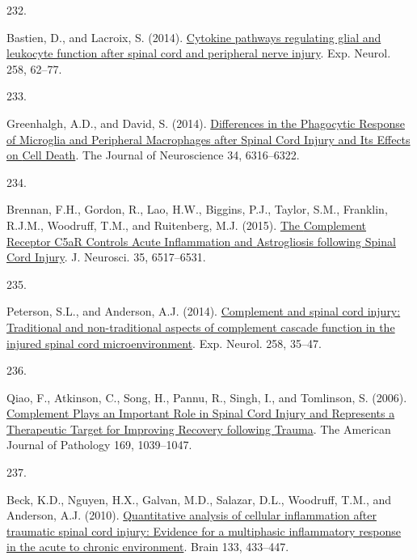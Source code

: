 \documentclass[
]{article}
\newlength{\cslhangindent}
\newlength{\csllabelwidth}
\newlength{\cslentryspacingunit} %
\newenvironment{CSLReferences}[2] %
 {%
  \setlength{\parindent}{0pt}
  \ifodd #1
  \let\oldpar\par
  \def\par{\hangindent=\cslhangindent\oldpar}
  \fi
  \setlength{\parskip}{#2\cslentryspacingunit}
 }%
 {}
\newcommand{\CSLLeftMargin}[1]{\parbox[t]{\csllabelwidth}{#1}}
\newcommand{\CSLRightInline}[1]{\parbox[t]{\linewidth - \csllabelwidth}{#1}\break}
\begin{document}
\begin{CSLReferences}{0}{0}
\leavevmode{}%
\CSLLeftMargin{232. }
\CSLRightInline{Bastien, D., and Lacroix, S. (2014). \href{https://doi.org/10.1016/j.expneurol.2014.04.006}{Cytokine pathways regulating glial and leukocyte function after spinal cord and peripheral nerve injury}. Exp. Neurol. 258, 62--77.}

\leavevmode{}%
\CSLLeftMargin{233. }
\CSLRightInline{Greenhalgh, A.D., and David, S. (2014). \href{https://doi.org/10.1523/JNEUROSCI.4912-13.2014}{Differences in the {Phagocytic Response} of {Microglia} and {Peripheral Macrophages} after {Spinal Cord Injury} and {Its Effects} on {Cell Death}}. The Journal of Neuroscience 34, 6316--6322.}

\leavevmode{}%
\CSLLeftMargin{234. }
\CSLRightInline{Brennan, F.H., Gordon, R., Lao, H.W., Biggins, P.J., Taylor, S.M., Franklin, R.J.M., Woodruff, T.M., and Ruitenberg, M.J. (2015). \href{https://doi.org/10.1523/JNEUROSCI.5218-14.2015}{The {Complement Receptor C5aR Controls Acute Inflammation} and {Astrogliosis} following {Spinal Cord Injury}}. J. Neurosci. 35, 6517--6531.}

\leavevmode{}%
\CSLLeftMargin{235. }
\CSLRightInline{Peterson, S.L., and Anderson, A.J. (2014). \href{https://doi.org/10.1016/j.expneurol.2014.04.028}{Complement and spinal cord injury: {Traditional} and non-traditional aspects of complement cascade function in the injured spinal cord microenvironment}. Exp. Neurol. 258, 35--47.}

\leavevmode{}%
\CSLLeftMargin{236. }
\CSLRightInline{Qiao, F., Atkinson, C., Song, H., Pannu, R., Singh, I., and Tomlinson, S. (2006). \href{https://doi.org/10.2353/ajpath.2006.060248}{Complement {Plays} an {Important Role} in {Spinal Cord Injury} and {Represents} a {Therapeutic Target} for {Improving Recovery} following {Trauma}}. The American Journal of Pathology 169, 1039--1047.}

\leavevmode{}%
\CSLLeftMargin{237. }
\CSLRightInline{Beck, K.D., Nguyen, H.X., Galvan, M.D., Salazar, D.L., Woodruff, T.M., and Anderson, A.J. (2010). \href{https://doi.org/10.1093/brain/awp322}{Quantitative analysis of cellular inflammation after traumatic spinal cord injury: Evidence for a multiphasic inflammatory response in the acute to chronic environment}. Brain 133, 433--447.}


\end{CSLReferences}
\end{document}
